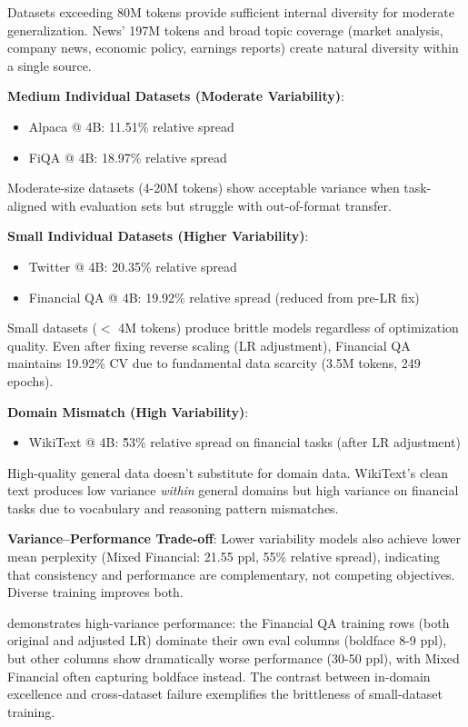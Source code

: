 Datasets exceeding 80M tokens provide sufficient internal diversity for moderate generalization. News' 197M tokens and broad topic coverage (market analysis, company news, economic policy, earnings reports) create natural diversity within a single source.

\textbf{Medium Individual Datasets (Moderate Variability)}:
\begin{itemize}
\item Alpaca @ 4B: 11.51\% relative spread
\item FiQA @ 4B: 18.97\% relative spread
\end{itemize}

Moderate-size datasets (4-20M tokens) show acceptable variance when task-aligned with evaluation sets but struggle with out-of-format transfer.

\textbf{Small Individual Datasets (Higher Variability)}:
\begin{itemize}
\item Twitter @ 4B: 20.35\% relative spread
\item Financial QA @ 4B: 19.92\% relative spread (reduced from pre-LR fix)
\end{itemize}

Small datasets ($<$ 4M tokens) produce brittle models regardless of optimization quality. Even after fixing reverse scaling (LR adjustment), Financial QA maintains 19.92\% CV due to fundamental data scarcity (3.5M tokens, 249 epochs).

\textbf{Domain Mismatch (High Variability)}:
\begin{itemize}
\item WikiText @ 4B: \~53\% relative spread on financial tasks (after LR adjustment)
\end{itemize}

High-quality general data doesn't substitute for domain data. WikiText's clean text produces low variance \textit{within} general domains but high variance on financial tasks due to vocabulary and reasoning pattern mismatches.

\textbf{Variance–Performance Trade-off}: Lower variability models also achieve lower mean perplexity (Mixed Financial: 21.55 ppl, 55\% relative spread), indicating that consistency and performance are complementary, not competing objectives. Diverse training improves both.



 demonstrates high-variance performance: the Financial QA training rows (both original and adjusted LR) dominate their own eval columns (boldface 8-9 ppl), but other columns show dramatically worse performance (30-50 ppl), with Mixed Financial often capturing boldface instead. The contrast between in-domain excellence and cross-dataset failure exemplifies the brittleness of small-dataset training.

